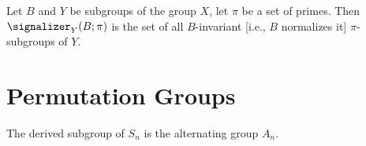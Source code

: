 \begin{definition}
Let $B$ and $Y$ be subgroups of the group $X$, let $\pi$ be a set of primes.
Then $\signalizer_{Y}(B;\pi)$ is the set of all $B$-invariant [i.e., $B$
normalizes it] $\pi$-subgroups of $Y$.
\end{definition}


\section{Permutation Groups}

\begin{theorem}[Orre]
The derived subgroup of $S_{n}$ is the alternating group $A_{n}$.
\end{theorem}







